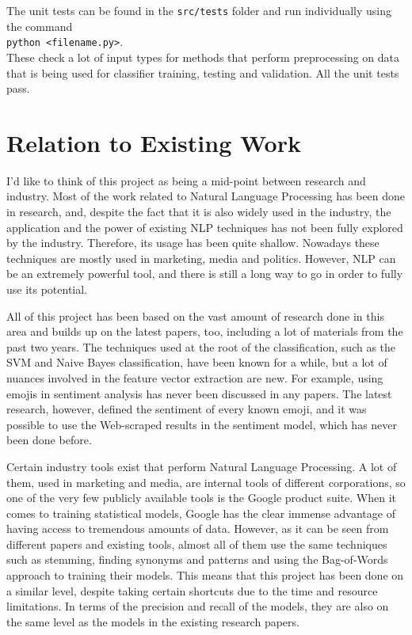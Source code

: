 The unit tests can be found in the \texttt{src/tests} folder and run individually using the command \\ \texttt{python <filename.py>}. \\ These check a lot of input types for methods that perform preprocessing on data that is being used for classifier training, testing and validation. All the unit tests pass. 


\section{Relation to Existing Work}
\label{sec:relation}

I'd like to think of this project as being a mid-point between research and industry. Most of the work related to Natural Language Processing has been done in research, and, despite the fact that it is also widely used in the industry, the application and the power of existing NLP techniques has not been fully explored by the industry. Therefore, its usage has been quite shallow. Nowadays these techniques are mostly used in marketing, media and politics. However, NLP can be an extremely powerful tool, and there is still a long way to go in order to fully use its potential.

All of this project has been based on the vast amount of research done in this area and builds up on the latest papers, too, including a lot of materials from the past two years. The techniques used at the root of the classification, such as the SVM and Naive Bayes classification, have been known for a while, but a lot of nuances involved in the feature vector extraction are new. For example, using emojis in sentiment analysis has never been discussed in any papers. The latest research, however, defined the sentiment of every known emoji, and it was possible to use the Web-scraped results in the sentiment model, which has never been done before. 

Certain industry tools exist that perform Natural Language Processing. A lot of them, used in marketing and media, are internal tools of different corporations, so one of the very few publicly available tools is the Google product suite. When it comes to training statistical models, Google has the clear immense advantage of having access to tremendous amounts of data. However, as it can be seen from different papers and existing tools, almost all of them use the same techniques such as stemming, finding synonyms and patterns and using the Bag-of-Words approach to training their models. This means that this project has been done on a similar level, despite taking certain shortcuts due to the time and resource limitations. In terms of the precision and recall of the models, they are also on the same level as the models in the existing research papers. 